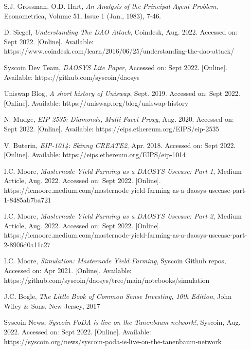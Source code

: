 \documentclass[journal,twocolumn,12pt]{ieeesyscoin}
\begin{document}
\begin{thebibliography}{00}

 S.J. Grossman, O.D. Hart, \textit{An Analysis of the Principal-Agent Problem}, Econometrica, Volume 51, Issue 1 (Jan., 1983), 7-46.

 D. Siegel, \textit{Understanding The DAO Attack}, Coindesk, Aug. 2022. Accessed on: Sept 2022. [Online]. Available: https://www.coindesk.com/learn/2016/06/25/understanding-the-dao-attack/

 Syscoin Dev Team, \textit{DAOSYS Lite Paper}, Accessed on: Sept 2022.  [Online]. Available:  https://github.com/syscoin/daosys

 Uniswap Blog, \textit{A short history of Uniswap}, Sept. 2019. Accessed on: Sept 2022.  [Online]. Available:  https://uniswap.org/blog/uniswap-history

 N. Mudge, \textit{EIP-2535: Diamonds, Multi-Facet Proxy}, Aug. 2020. Accessed on: Sept 2022.  [Online]. Available: https://eips.ethereum.org/EIPS/eip-2535

 V. Buterin, \textit{EIP-1014: Skinny CREATE2}, Apr. 2018. Accessed on: Sept 2022.  [Online]. Available: https://eips.ethereum.org/EIPS/eip-1014

 I.C. Moore,  \textit{Masternode Yield Farming as a DAOSYS Usecase: Part 1}, Medium Article, Aug. 2022. Accessed on: Sept 2022.  [Online]. https://icmoore.medium.com/masternode-yield-farming-as-a-daosys-usecase-part-1-8485ab7ba721

 I.C. Moore,  \textit{Masternode Yield Farming as a DAOSYS Usecase: Part 2}, Medium Article, Aug. 2022. Accessed on: Sept 2022.  [Online]. https://icmoore.medium.com/masternode-yield-farming-as-a-daosys-usecase-part-2-8906d0a11c27

 I.C. Moore, \textit{Simulation: Masternode Yield Farming}, Syscoin Github repos, Accessed on: Apr 2021.  [Online]. Available: https://github.com/syscoin/daosys/tree/main/notebooks/simulation

 J.C. Bogle, \textit{The Little Book of Common Sense Investing, 10th Edition}, John Wiley \& Sons, New Jersey, 2017

 Syscoin News, \textit{Syscoin PoDA is live on the Tanenbaum network!}, Syscoin, Aug. 2022. Accessed on: Sept 2022.  [Online]. Available: https://syscoin.org/news/syscoin-poda-is-live-on-the-tanenbaum-network


\end{thebibliography}
\end{document}
